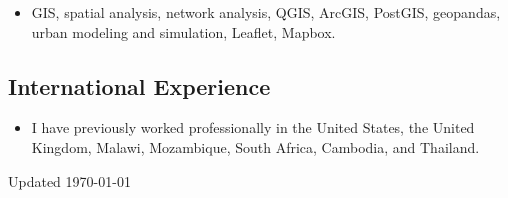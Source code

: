 \documentclass{academiccv}
\begin{document}
\begin{itemize}
\item GIS, spatial analysis, network analysis, QGIS, ArcGIS, PostGIS, geopandas, urban modeling and simulation, Leaflet, Mapbox.
\end{itemize}

\subsection*{International Experience}

\begin{itemize}
\item I have previously worked professionally in the United States, the United Kingdom, Malawi, Mozambique, South Africa, Cambodia, and Thailand.
\end{itemize}



\begin{center}
\vspace{6em}
Updated \monthyeardate\today
\end{center} 
\end{document}
